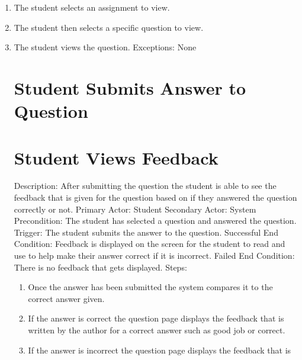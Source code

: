         \begin{enumerate}
            \item{The student selects an assignment to view.}
            \item{The student then selects a specific question to view.}
            \item{The student views the question.}
        Exceptions: None

    
    
    \section{Student Submits Answer to Question}
    
    
    
    \section{Student Views Feedback}
        Description: After submitting the question the student is able to see the feedback that is given for the 
        question based on if they answered the question correctly or not. \newline
        Primary Actor: Student \newline
        Secondary Actor: System \newline
        Precondition: The student has selected a question and answered the question. \newline
        Trigger: The student submits the answer to the question. \newline
        Successful End Condition: Feedback is displayed on the screen for the student 
        to read and use to help make their answer correct if it is incorrect. \newline
        Failed End Condition: There is no feedback that gets displayed. \newline
        \newline
        Steps:
        \begin{enumerate}
            \item{Once the answer has been submitted the system compares it to the correct answer given.}
            \item{If the answer is correct the question page displays the feedback that is 
            written by the author for a correct answer such as good job or correct.}
            \item{If the answer is incorrect the question page displays the feedback that is 
}
\end{enumerate}
\end{enumerate}
